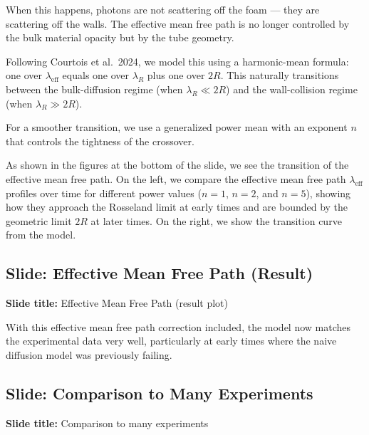 \documentclass[12pt, a4paper]{article}
\begin{document}
When this happens, photons are not scattering off the foam --- they are scattering off the walls. The effective mean free path is no longer controlled by the bulk material opacity but by the tube geometry.

Following Courtois et al.\ 2024, we model this using a harmonic-mean formula: one over $\lambda_\mathrm{eff}$ equals one over $\lambda_R$ plus one over $2R$. This naturally transitions between the bulk-diffusion regime (when $\lambda_R \ll 2R$) and the wall-collision regime (when $\lambda_R \gg 2R$).

For a smoother transition, we use a generalized power mean with an exponent $n$ that controls the tightness of the crossover.

As shown in the figures at the bottom of the slide, we see the transition of the effective mean free path. On the left, we compare the effective mean free path $\lambda_{\mathrm{eff}}$ profiles over time for different power values ($n=1$, $n=2$, and $n=5$), showing how they approach the Rosseland limit at early times and are bounded by the geometric limit $2R$ at later times. On the right, we show the transition curve from the model.

\subsection{Slide: Effective Mean Free Path (Result)}

\begin{slidebox}
\textbf{Slide title:} Effective Mean Free Path (result plot)
\end{slidebox}

With this effective mean free path correction included, the model now matches the experimental data very well, particularly at early times where the naive diffusion model was previously failing.

\subsection{Slide: Comparison to Many Experiments}

\begin{slidebox}
\textbf{Slide title:} Comparison to many experiments
\end{slidebox}
\end{document}
